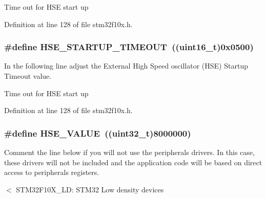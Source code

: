 Time out for H\+SE start up 

Definition at line 128 of file stm32f10x.\+h.

\subsubsection[{\texorpdfstring{H\+S\+E\+\_\+\+S\+T\+A\+R\+T\+U\+P\+\_\+\+T\+I\+M\+E\+O\+UT}{HSE_STARTUP_TIMEOUT}}]{\setlength{\rightskip}{0pt plus 5cm}\#define H\+S\+E\+\_\+\+S\+T\+A\+R\+T\+U\+P\+\_\+\+T\+I\+M\+E\+O\+UT~(({\bf uint16\+\_\+t})0x0500)}\hypertarget{group___library__configuration__section_ga68ecbc9b0a1a40a1ec9d18d5e9747c4f}{}\label{group___library__configuration__section_ga68ecbc9b0a1a40a1ec9d18d5e9747c4f}


In the following line adjust the External High Speed oscillator (H\+SE) Startup Timeout value. 

Time out for H\+SE start up 

Definition at line 128 of file stm32f10x.\+h.

\subsubsection[{\texorpdfstring{H\+S\+E\+\_\+\+V\+A\+L\+UE}{HSE_VALUE}}]{\setlength{\rightskip}{0pt plus 5cm}\#define H\+S\+E\+\_\+\+V\+A\+L\+UE~(({\bf uint32\+\_\+t})8000000)}\hypertarget{group___library__configuration__section_gaeafcff4f57440c60e64812dddd13e7cb}{}\label{group___library__configuration__section_gaeafcff4f57440c60e64812dddd13e7cb}


Comment the line below if you will not use the peripherals drivers. In this case, these drivers will not be included and the application code will be based on direct access to peripherals registers. 

$<$ S\+T\+M32\+F10\+X\+\_\+\+LD\+: S\+T\+M32 Low density devices

